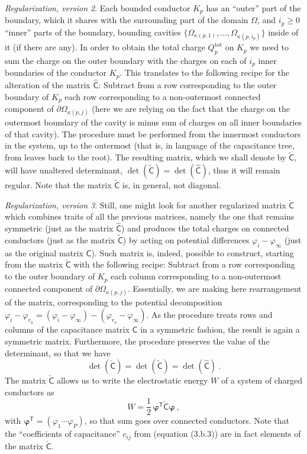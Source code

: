 \documentclass[12pt]{iopart}
\newcommand{\dd}{\partial}
\newcommand{\be}{\begin{equation}}
\newcommand{\ee}{\end{equation}}
\newcommand{\mx}[1]{\bm{\mathsf{#1}}}
\newcommand{\trans}{^{\mathsf{T}}}
\newcommand{\0}{\vct{0}}
\theoremstyle{plain} \newtheorem{tm}{Theorem}[section]
\theoremstyle{plain} \newtheorem{lm}[tm]{Lemma}
\theoremstyle{definition} \newtheorem{defn}[tm]{Definition}
\begin{document}
\medskip



\emph{Regularization, version 2}. Each bounded conductor $K_p$ has an ``outer'' part of the boundary, which it shares with the surrounding part of the domain $\Omega$, and $i_p \ge 0$ ``inner'' parts of the boundary, bounding cavities $\{\Omega_{\kappa(p,1)},\dots,\Omega_{\kappa(p,i_p)}\}$ inside of it (if there are any). In order to obtain the total charge $Q^{\mathrm{tot}}_p$ on $K_p$ we need to sum the charge on the outer boundary with the charges on each of $i_p$ inner boundaries of the conductor $K_p$. This translates to the following recipe for the alteration of the matrix $\mx{\widehat{C}}$: Subtract from a row corresponding to the outer boundary of $K_p$ each row corresponding to a non-outermost connected component of $\dd\Omega_{\kappa(p,j)}$ (here we are relying on the fact that the charge on the outermost boundary of the cavity is minus sum of charges on all inner boundaries of that cavity). The procedure must be performed from the innermost conductors in the system, up to the outermost (that is, in language of the capacitance tree, from leaves back to the root). The resulting matrix, which we shall denote by $\mx{\widetilde{C}}$, will have unaltered determinant, $\det(\mx{\widetilde{C}}) = \det(\mx{\widehat{C}})$, thus it will remain regular. Note that the matrix $\mx{\widetilde{C}}$ is, in general, not diagonal.

\medskip



\emph{Regularization, version 3}. Still, one might look for another regularized matrix $\mx{\check{C}}$ which combines traits of all the previous matrices, namely the one that remains symmetric (just as the matrix $\mx{\widehat{C}}$) and produces the total charges on connected conductors (just as the matrix $\mx{\widetilde{C}}$) by acting on potential differences $\varphi_i - \varphi_\infty$ (just as the original matrix $\mx{C}$). Such matrix is, indeed, possible to construct, starting from the matrix $\mx{\widetilde{C}}$ with the following recipe: Subtract from a row corresponding to the outer boundary of $K_p$ each column corresponding to a non-outermost connected component of $\dd\Omega_{\kappa(p,j)}$. Essentially, we are making here rearrangement of the matrix, corresponding to the potential decomposition $\varphi_i - \varphi_{r_a} = (\varphi_i - \varphi_\infty) - (\varphi_{r_a} - \varphi_\infty)$. As the procedure treats rows and columns of the capacitance matrix $\mx{C}$ in a symmetric fashion, the result is again a symmetric matrix. Furthermore, the procedure preserves the value of the determinant, so that we have
\be
\det(\mx{\check{C}}) = \det(\mx{\widetilde{C}}) = \det(\mx{\widehat{C}}) \ .
\ee
The matrix $\mx{\check{C}}$ allows us to write the electrostatic energy $W$ of a system of charged conductors as
\be
W = \frac{1}{2} \, \bm{\varphi}\trans \mx{\check{C}} \bm{\varphi} \ ,
\ee
with $\bm{\varphi}\trans = (\varphi_1 \cdots \varphi_P)$, so that sum goes over connected conductors. Note that the ``coefficients of capacitance'' $c_{ij}$ from \cite{BT} (equation (3.b.3)) are in fact elements of the matrix $\mx{\check{C}}$.
\end{document}
